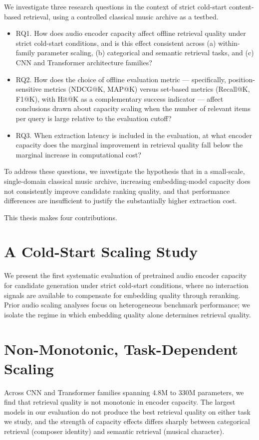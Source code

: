 \documentclass{CPP}
\begin{document}
We investigate three research questions in the context of strict cold-start content-based retrieval, using a controlled classical music archive as a testbed.
\begin{itemize}
    \item RQ1. How does audio encoder capacity affect offline retrieval quality under strict cold-start conditions, and is this effect consistent across (a) within-family parameter scaling, (b) categorical and semantic retrieval tasks, and (c) CNN and Transformer architecture families?
    \item RQ2. How does the choice of offline evaluation metric --- specifically, position-sensitive metrics (NDCG@K, MAP@K) versus set-based metrics (Recall@K, F1@K), with Hit@K as a complementary success indicator --- affect conclusions drawn about capacity scaling when the number of relevant items per query is large relative to the evaluation cutoff?
    \item RQ3. When extraction latency is included in the evaluation, at what encoder capacity does the marginal improvement in retrieval quality fall below the marginal increase in computational cost?
\end{itemize}

To address these questions, we investigate the hypothesis that in a small-scale, single-domain classical music archive, increasing embedding-model capacity does not consistently improve candidate ranking quality, and that performance differences are insufficient to justify the substantially higher extraction cost.

This thesis makes four contributions.

\section{A Cold-Start Scaling Study}
We present the first systematic evaluation of pretrained audio encoder capacity for candidate generation under strict cold-start conditions, where no interaction signals are available to compensate for embedding quality through reranking. Prior audio scaling analyses focus on heterogeneous benchmark performance; we isolate the regime in which embedding quality alone determines retrieval quality.

\section{Non-Monotonic, Task-Dependent Scaling}
Across CNN and Transformer families spanning 4.8M to 330M parameters, we find that retrieval quality is not monotonic in encoder capacity. The largest models in our evaluation do not produce the best retrieval quality on either task we study, and the strength of capacity effects differs sharply between categorical retrieval (composer identity) and semantic retrieval (musical character).
\end{document}
